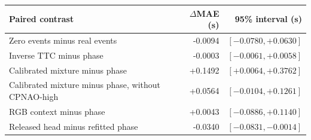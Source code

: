 \begin{tabular}{lrr}
\toprule
Paired contrast & $\Delta$MAE (s) & 95\% interval (s) \\
\midrule
Zero events minus real events & -0.0094 & $[-0.0780,+0.0630]$ \\
Inverse TTC minus phase & -0.0003 & $[-0.0061,+0.0058]$ \\
Calibrated mixture minus phase & +0.1492 & $[+0.0064,+0.3762]$ \\
Calibrated mixture minus phase, without CPNAO-high & +0.0564 & $[-0.0104,+0.1261]$ \\
RGB context minus phase & +0.0043 & $[-0.0886,+0.1140]$ \\
Released head minus refitted phase & -0.0340 & $[-0.0831,-0.0014]$ \\
\bottomrule
\end{tabular}
